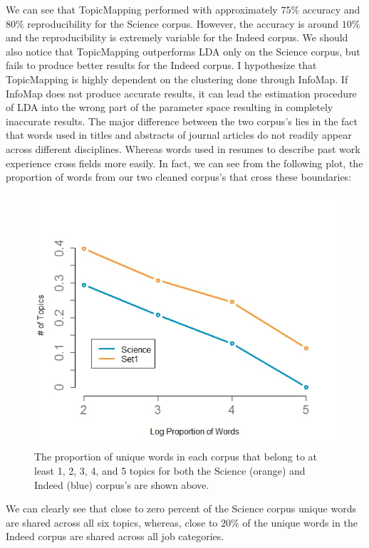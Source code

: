 \documentclass[12pt]{article}
\begin{document}
\noindent We can see that TopicMapping performed with approximately $75\%$ accuracy and $80\%$ reproducibility for the Science corpus. However, the accuracy is around $10\%$ and the reproducibility is extremely variable for the Indeed corpus. We should also notice that TopicMapping outperforms LDA only on the Science corpus, but fails to produce better results for the Indeed corpus. I hypothesize that TopicMapping is highly dependent on the clustering done through InfoMap. If InfoMap does not produce accurate results, it can lead the estimation procedure of LDA into the wrong part of the parameter space resulting in completely inaccurate results. The major difference between the two corpus's lies in the fact that words used in titles and abstracts of journal articles do not readily appear across different disciplines. Whereas words used in resumes to describe past work experience cross fields more easily. In fact, we can see from the following plot, the proportion of words from our two cleaned corpus's that cross these boundaries:
\vspace{2mm}
\begin{figure}[H]
	\centering
	\includegraphics[scale=0.5]{Images/props.jpeg}
\caption{The proportion of unique words in each corpus that belong to at least 1, 2, 3, 4, and 5 topics for both the Science (orange) and Indeed (blue) corpus's are shown above.}
\end{figure}
\vspace{2mm}

\noindent We can clearly see that close to zero percent of the Science corpus unique words are shared across all six topics, whereas, close to $20\%$ of the unique words in the Indeed corpus are shared across all job categories.
\end{document}
